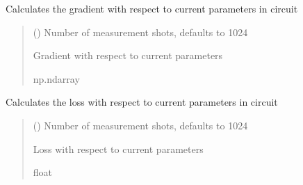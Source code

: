 \documentclass[letterpaper,10pt,english]{sphinxmanual}
\begin{document}
\begin{fulllineitems}
\begin{fulllineitems}
\label{\detokenize{qcompute_qapp.algorithm:qcompute_qapp.algorithm.VQE.get_gradient}}
\pysigstartsignatures
{}
\pysigstopsignatures
\sphinxAtStartPar
Calculates the gradient with respect to current parameters in circuit
\begin{quote}\begin{description}
\sphinxAtStartPar
{} () \textendash{} Number of measurement shots, defaults to 1024

\sphinxAtStartPar
Gradient with respect to current parameters

\sphinxAtStartPar
np.ndarray

\end{description}\end{quote}

\end{fulllineitems}


\begin{fulllineitems}
\label{\detokenize{qcompute_qapp.algorithm:qcompute_qapp.algorithm.VQE.get_loss}}
\pysigstartsignatures
{}
\pysigstopsignatures
\sphinxAtStartPar
Calculates the loss with respect to current parameters in circuit
\begin{quote}\begin{description}
\sphinxAtStartPar
{} () \textendash{} Number of measurement shots, defaults to 1024

\sphinxAtStartPar
Loss with respect to current parameters

\sphinxAtStartPar
float


\end{description}
\end{quote}
\end{fulllineitems}
\end{fulllineitems}
\end{document}

